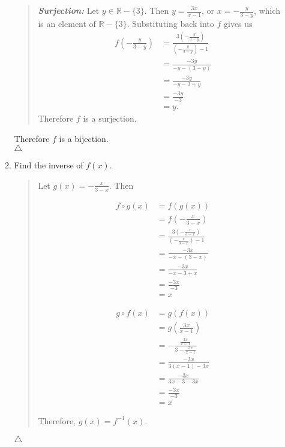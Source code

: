 \documentclass{article}
\newcommand{\RR}{\mathbb{R}}
\begin{document}
\begin{enumerate}
\begin{enumerate}
\begin{quote}
\textit{\textbf{Surjection: }} Let $y \in \RR - \{3\}$.
Then $y = \frac{3x}{x - 1}$, or $x = -\frac{y}{3-y}$, which is an element of $\RR - \{3\}$.
Substituting back into $f$ gives us
\begin{align*}
f\left(-\frac{y}{3-y}\right) &= \frac{3\left(-\frac{y}{3-y}\right)}{\left(-\frac{y}{3-y}\right) - 1}\\
&= \frac{-3y}{-y-(3-y)}\\
&= \frac{-3y}{-y - 3 + y}\\
&= \frac{-3y}{-3}\\
&= y.
\end{align*}
Therefore $f$ is a surjection.
\end{quote}
Therefore $f$ is a bijection.\\
$\triangle$
\item Find the inverse of $f(x)$.
\begin{quote}
Let $g(x) = -\frac{x}{3 - x}$.
Then
\hspace{-0.25\textwidth}
\begin{minipage}[t]{0.4\textwidth}
\begin{align*}
f\circ g(x) &= f(g(x))\\
&= f\left(-\frac{x}{3 - x}\right)\\
&= \frac{3\left(-\frac{x}{3-x}\right)}{\left(-\frac{x}{3-x}\right) - 1}\\
&= \frac{-3x}{-x-(3-x)}\\
&= \frac{-3x}{-x - 3 + x}\\
&= \frac{-3x}{-3}\\
&= x
\end{align*}
\end{minipage}
\begin{minipage}[t]{0.4\textwidth}
\begin{align*}
g \circ f(x) &= g(f(x))\\
&= g(\frac{3x}{x-1})\\
&= -\frac{\frac{3x}{x-1}}{3-\frac{3x}{x-1}}\\
&= \frac{-3x}{3(x-1)-3x}\\
&= \frac{-3x}{3x - 3 - 3x}\\
&= \frac{-3x}{-3}\\
&= x
\end{align*}
\end{minipage}
Therefore, $g(x) = f^{-1}(x)$.
\end{quote}
$\triangle$
\end{enumerate}
\end{enumerate}
\end{document}
